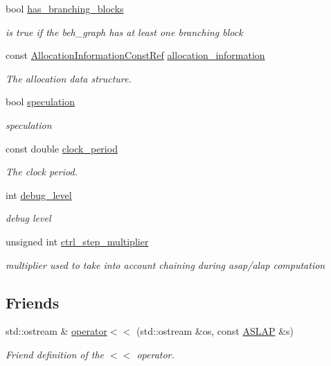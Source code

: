 \begin{DoxyCompactItemize}
bool \hyperlink{classASLAP_aef4d41c0497eb290e2d74653cf3f2d5b}{has\+\_\+branching\+\_\+blocks}
\begin{DoxyCompactList}\small\item\em is true if the beh\+\_\+graph has at least one branching block \end{DoxyCompactList}\item 
const \hyperlink{allocation__information_8hpp_a54287618a63bf87e31ddb17ba01e7ca7}{Allocation\+Information\+Const\+Ref} \hyperlink{classASLAP_a248a492b911d55531c0ff0dec1d31c0a}{allocation\+\_\+information}
\begin{DoxyCompactList}\small\item\em The allocation data structure. \end{DoxyCompactList}\item 
bool \hyperlink{classASLAP_a90fd3ac454f4224f8ac7b57da07b59d3}{speculation}
\begin{DoxyCompactList}\small\item\em speculation \end{DoxyCompactList}\item 
const double \hyperlink{classASLAP_af86d05e7a3d89bf59095526832efc59f}{clock\+\_\+period}
\begin{DoxyCompactList}\small\item\em The clock period. \end{DoxyCompactList}\item 
int \hyperlink{classASLAP_a733320650c283a3fb57e0053495e62a9}{debug\+\_\+level}
\begin{DoxyCompactList}\small\item\em debug level \end{DoxyCompactList}\item 
unsigned int \hyperlink{classASLAP_a05235b4e84d76843372f10005b4be5ea}{ctrl\+\_\+step\+\_\+multiplier}
\begin{DoxyCompactList}\small\item\em multiplier used to take into account chaining during asap/alap computation \end{DoxyCompactList}\end{DoxyCompactItemize}
\subsection*{Friends}
\begin{DoxyCompactItemize}
\item 
std\+::ostream \& \hyperlink{classASLAP_af8ab58211340ecad608499bdac9dd41f}{operator$<$$<$} (std\+::ostream \&os, const \hyperlink{classASLAP}{A\+S\+L\+AP} \&s)
\begin{DoxyCompactList}\small\item\em Friend definition of the $<$$<$ operator. \end{DoxyCompactList}\end{DoxyCompactItemize}


